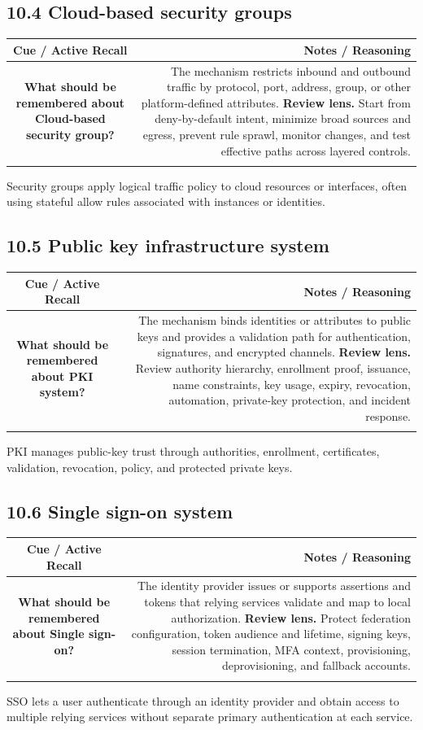 \documentclass[11pt]{article}
\newcommand{\CornellHeader}{\rowcolor{Navy}\color{white}\bfseries Cue / Active Recall & \color{white}\bfseries Notes / Reasoning \\\endhead}
\newcommand{\CornellRow}[2]{\cellcolor{CueGray}\textbf{#1} & #2 \\\addlinespace[3pt]}
\begin{document}
\subsection{10.4 Cloud-based security groups}
\begin{longtable}{@{}C N@{}}
\CornellHeader
\CornellRow{What should be remembered about Cloud-based security group?}{The mechanism restricts inbound and outbound traffic by protocol, port, address, group, or other platform-defined attributes. \textbf{Review lens.} Start from deny-by-default intent, minimize broad sources and egress, prevent rule sprawl, monitor changes, and test effective paths across layered controls.}
\end{longtable}
\begin{sectionsummarybox}
Security groups apply logical traffic policy to cloud resources or interfaces, often using stateful allow rules associated with instances or identities.
\end{sectionsummarybox}
\subsection{10.5 Public key infrastructure system}
\begin{longtable}{@{}C N@{}}
\CornellHeader
\CornellRow{What should be remembered about PKI system?}{The mechanism binds identities or attributes to public keys and provides a validation path for authentication, signatures, and encrypted channels. \textbf{Review lens.} Review authority hierarchy, enrollment proof, issuance, name constraints, key usage, expiry, revocation, automation, private-key protection, and incident response.}
\end{longtable}
\begin{sectionsummarybox}
PKI manages public-key trust through authorities, enrollment, certificates, validation, revocation, policy, and protected private keys.
\end{sectionsummarybox}
\subsection{10.6 Single sign-on system}
\begin{longtable}{@{}C N@{}}
\CornellHeader
\CornellRow{What should be remembered about Single sign-on?}{The identity provider issues or supports assertions and tokens that relying services validate and map to local authorization. \textbf{Review lens.} Protect federation configuration, token audience and lifetime, signing keys, session termination, MFA context, provisioning, deprovisioning, and fallback accounts.}
\end{longtable}
\begin{sectionsummarybox}
SSO lets a user authenticate through an identity provider and obtain access to multiple relying services without separate primary authentication at each service.
\end{sectionsummarybox}
\end{document}
